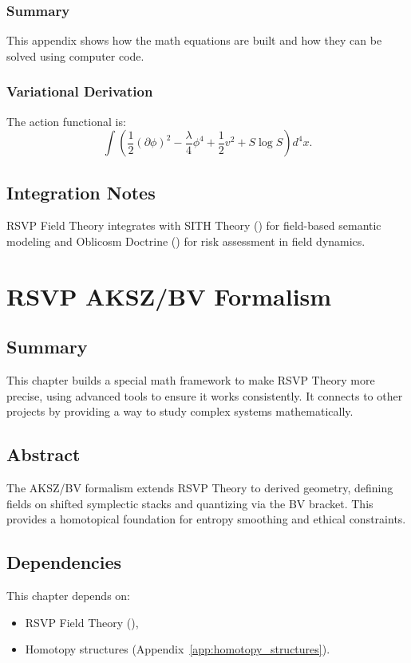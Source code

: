 \documentclass[11pt,oneside]{memoir}
\theoremstyle{plain}
\begin{document}
\subsection{Summary}
This appendix shows how the math equations are built and how they can be solved using computer code.

\subsection{Variational Derivation}
The action functional is:
\begin{equation}
    \int \left( \frac{1}{2} (\partial \phi)^2 - \frac{\lambda}{4} \phi^4 + \frac{1}{2} v^2 + S \log S \right) d^4 x.
\end{equation}

\section{Integration Notes}
RSVP Field Theory integrates with SITH Theory () for field-based semantic modeling and Oblicosm Doctrine () for risk assessment in field dynamics.

\chapter{RSVP AKSZ/BV Formalism}
\label{sec:rsvp_aksz}
\section{Summary}
This chapter builds a special math framework to make RSVP Theory more precise, using advanced tools to ensure it works consistently. It connects to other projects by providing a way to study complex systems mathematically.

\section{Abstract}
The AKSZ/BV formalism extends RSVP Theory to derived geometry, defining fields on shifted symplectic stacks and quantizing via the BV bracket. This provides a homotopical foundation for entropy smoothing and ethical constraints.

\section{Dependencies}
This chapter depends on:
\begin{itemize}
    \item RSVP Field Theory (),
    \item Homotopy structures (Appendix~\ref{app:homotopy_structures}).
\end{itemize}
\end{document}
